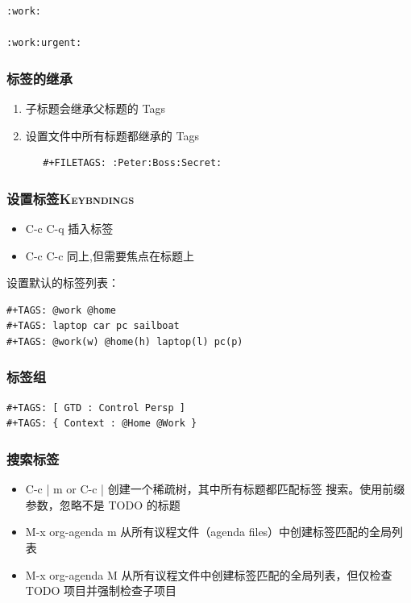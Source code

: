 \documentclass[11pt]{article}
\begin{document}
\begin{verbatim}
:work:

:work:urgent:
\end{verbatim}
\subsubsection{标签的继承}
\label{sec:org7c1603f}
\begin{enumerate}
\item 子标题会继承父标题的 Tags
\item 设置文件中所有标题都继承的 Tags
\begin{verbatim}
   #+FILETAGS: :Peter:Boss:Secret:
\end{verbatim}
\end{enumerate}
\subsubsection{设置标签\hfill{}\textsc{Keybndings}}
\label{sec:orgdb9b893}
\begin{itemize}
\item C-c C-q
插入标签
\item C-c C-c
同上,但需要焦点在标题上
\end{itemize}

设置默认的标签列表：
\begin{verbatim}
#+TAGS: @work @home
#+TAGS: laptop car pc sailboat
#+TAGS: @work(w) @home(h) laptop(l) pc(p)
\end{verbatim}
\subsubsection{标签组}
\label{sec:orgcee02b0}
\begin{verbatim}
#+TAGS: [ GTD : Control Persp ]
#+TAGS: { Context : @Home @Work }
\end{verbatim}
\subsubsection{搜索标签}
\label{sec:org2e00f94}
\begin{itemize}
\item C-c | m or C-c |
创建一个稀疏树，其中所有标题都匹配标签
搜索。使用前缀参数，忽略不是 TODO 的标题
\item M-x org-agenda m
从所有议程文件（agenda files）中创建标签匹配的全局列表
\item M-x org-agenda M
从所有议程文件中创建标签匹配的全局列表，但仅检查 TODO 项目并强制检查子项目
\end{itemize}
\end{document}
